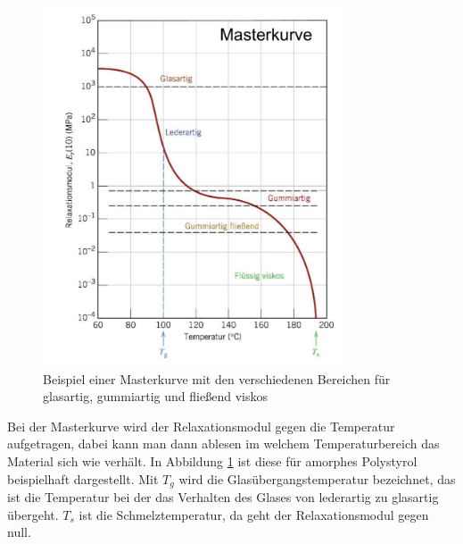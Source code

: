 \documentclass[11pt,a4paper]{article}
\numberwithin{equation}{section}
\numberwithin{figure}{section}
\begin{document}
\\
\begin{addmargin}[25pt]{0pt}
\begin{figure}[h]
    \centering
    \includegraphics[width = 0.8\textwidth]{images/Materialwissenschaften/Masterkurve.jpeg}
    \caption{Beispiel einer Masterkurve mit den verschiedenen Bereichen für glasartig, gummiartig und fließend viskos}
    \label{fig:Masterkurve}
\end{figure}
Bei der Masterkurve wird der Relaxationsmodul gegen die Temperatur aufgetragen, dabei kann man dann ablesen im welchem Temperaturbereich das Material sich wie verhält. In Abbildung \ref{fig:Masterkurve} ist diese für amorphes Polystyrol beispielhaft dargestellt. Mit $T_g$ wird die Glasübergangstemperatur bezeichnet, das ist die Temperatur bei der das Verhalten des Glases von lederartig zu glasartig übergeht. $T_s$ ist die Schmelztemperatur, da geht der Relaxationsmodul gegen null.\\
\end{addmargin}
\end{document}

